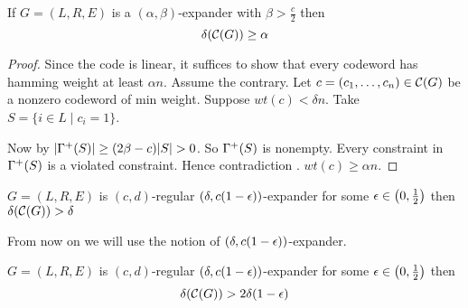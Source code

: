 \begin{theorem}\label{distdeln}
	If $G=(L,R,E) $ is a $(\alpha,\beta)$-expander with $\beta>\frac{c}2$ then $$\delta(\mathcal{C}(G))\geq \alpha$$
\end{theorem}
\begin{proof}
		Since the code is linear, it suffices to show that every codeword has hamming weight at least $\alpha n $. Assume the contrary.	Let $c=(c_1,\dots,c_n)\in \mathcal{C}(G)$ be a nonzero codeword of min weight. Suppose $wt(c)<\delta n$. Take $S=\{i\in L\mid c_i=1\}$. 
	
	Now by  $|\Gm^+(S)|\geq (2\beta-c)|S|>0$. So $\Gamma^+(S)$ is nonempty. Every constraint in $\Gamma^+(S)$ is a violated constraint. Hence contradiction \ctr. $wt(c)\geq \alpha n$.
\end{proof}
\begin{corollary}
	$G=(L,R,E)$ is $(c,d)$-regular  $(\delta,c(1-\epsilon))$-expander for some $\epsilon\in \left(0,\frac12\right)$ then $\delta(\mathcal{C}(G))>\delta$
\end{corollary}
From now on we will use the notion of $(\delta,c(1-\epsilon))$-expander.
\begin{theorem}
	$G=(L,R,E)$ is $(c,d)$-regular  $(\delta,c(1-\epsilon))$-expander for some $\epsilon\in \left(0,\frac12\right)$ then $$\delta(\mathcal{C}(G))>2\delta(1-\epsilon)$$
\end{theorem}
